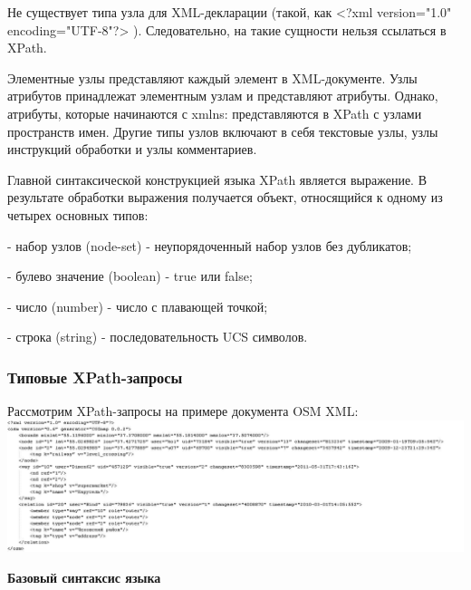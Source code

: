 \documentclass[12pt,a4paper,oneside]{article} %
\begin{document}
Не существует типа узла для XML-декларации (такой, \linebreak
как <?xml version="1.0" encoding="UTF-8"?> ). Следовательно, \linebreak
на такие сущности нельзя ссылаться в XPath.

Элементные узлы представляют каждый элемент в XML-документе. Узлы \linebreak
атрибутов принадлежат элементным узлам и представляют атрибуты. \linebreak
Однако, атрибуты, которые начинаются с xmlns: представляются в \linebreak
XPath с узлами пространств имен. Другие типы узлов включают в себя \linebreak
текстовые узлы, узлы инструкций обработки и узлы комментариев.

Главной синтаксической конструкцией языка XPath является выражение. \linebreak
В результате обработки выражения получается объект, относящийся к \linebreak
одному из четырех основных типов:

- набор узлов (node-set) - неупорядоченный набор узлов без дубликатов;

- булево значение (boolean) - true или false;

- число (number) - число с плавающей точкой;

- строка (string) - последовательность UCS символов.

\subsubsection{Типовые XPath-запросы}

Рассмотрим XPath-запросы на примере документа OSM XML:
\\[10pt]
\includegraphics[width=1.15\linewidth]{examplemap_osm}

\textbf{Базовый синтаксис языка}
\end{document}
